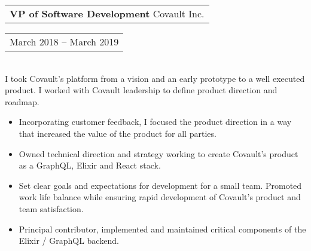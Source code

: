 \documentclass{resume}
\begin{document}
\begin{resume}
    \vspace{+0.1in}
    \begin{tabular}[t]{@{}l}
        {\bf VP of Software Development} Covault Inc.
    \end{tabular}\vspace{+0.05in}
    \hfill
    \begin{tabular}[t]{l@{}}
        March 2018 -- March 2019
    \end{tabular}\\
    I took Covault's platform from a vision and an early prototype to a well executed product. I worked with Covault leadership to define product direction and roadmap.
    \vspace{+0.05in}
    \begin{itemize} \itemsep -2pt
    \item Incorporating customer feedback, I focused the product direction in a way that increased the value of the product for all parties.
    \item Owned technical direction and strategy working to create Covault's product as a GraphQL, Elixir and React stack.
    \item Set clear goals and expectations for development for a small team. Promoted work life balance while ensuring rapid development of Covault's product and team satisfaction.
    \item Principal contributor, implemented and maintained critical components of the Elixir / GraphQL backend.
    \end{itemize}


\end{resume}
\end{document}
